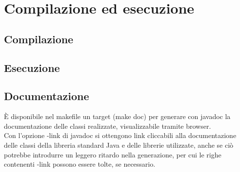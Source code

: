 \section{Compilazione ed esecuzione}

\subsection{Compilazione}
\subsection{Esecuzione}
\subsection{Documentazione}
È disponibile nel makefile un target (make doc) per generare con javadoc la documentazione delle classi realizzate, visualizzabile tramite browser.\\
Con l'opzione -link di javadoc si ottengono link cliccabili alla documentazione delle classi della libreria standard Java e delle librerie utilizzate, anche se ciò potrebbe introdurre un leggero ritardo nella generazione, per cui le righe contenenti -link possono essere tolte, se necessario.\\
